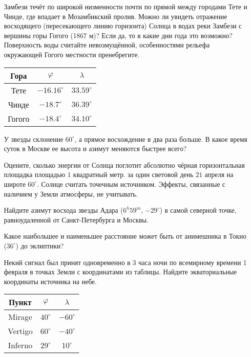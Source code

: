 \documentclass[14pt]{extarticle}
\begin{document}
Замбези течёт по широкой низменности почти по прямой
	между городами Тете и Чинде, где впадает в Мозамбикский
	пролив. Можно ли увидеть отражение восходящего (пересекающего линию горизонта) Солнца в водах реки Замбези
	с вершины горы Гогого (1867 м)? Если да, то в какие дни
	года это возможно? Поверхность воды считайте невозмущённой, особенностями рельефа окружающей Гогого
	местности пренебрегите. 
    \begin{center}
		\begin{tabular}{ccc}
			Гора & $\varphi$ & $\lambda$ \\
			\hline
			Тете & $-16.16^\circ$ & $33.59^\circ$ \\
			Чинде & $-18.7^\circ$ & $36.39^\circ$ \\
			Гогого & $-18.4^\circ$ & $34.10^\circ$ \\ 

		\end{tabular}
	\end{center}


У звезды склонение $60^\circ$, а прямое восхождение в два раза больше. В какое время суток в Москве ее высота и азимут меняются быстрее всего?

Оцените, сколько энергии от Солнца поглотит абсолютно чёрная горизонтальная площадка
	площадью $1$ квадратный метр.
	за один световой день $21$ апреля на широте $60^\circ$. Солнце считать точечным
	источником. Эффекты, связанные с наличием у Земли атмосферы, не учитывать.

Найдите азимут восхода звезды Адара ($6^h 59^m$, $-29^\circ$) в самой северной точке, равноудаленной от Санкт-Петербурга и Москвы.

Какое наибольшее и наименьшее расстояние может быть от анимешника в Токио ($36^\circ$) до эклиптики?

Некий сигнал был принят одновременно в $3$ часа ночи по всемирному времени 1 февраля в точках Земли с координатами из таблицы. Найдите экваториальные координаты источника на небе.
\begin{center}
    \begin{tabular}{ccc}
        Пункт & $\varphi$ & $\lambda$ \\
        \hline
        Mirage & $40^\circ$ & $-60^\circ$ \\
        Vertigo & $60^\circ$ & $-40^\circ$ \\
        Inferno & $29^\circ$ & $10^\circ$ \\ 

    \end{tabular}
\end{center}
\end{document}
